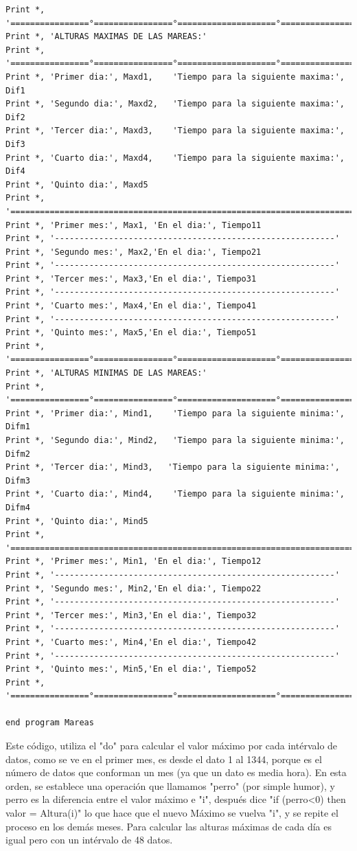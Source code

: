 \documentclass[12pt]{article}
\begin{document}
\begin{verbatim}
Print *, '================°================°====================°================°'
Print *, 'ALTURAS MAXIMAS DE LAS MAREAS:'
Print *, '================°================°====================°================°'
Print *, 'Primer dia:', Maxd1,    'Tiempo para la siguiente maxima:', Dif1
Print *, 'Segundo dia:', Maxd2,   'Tiempo para la siguiente maxima:', Dif2
Print *, 'Tercer dia:', Maxd3,    'Tiempo para la siguiente maxima:', Dif3
Print *, 'Cuarto dia:', Maxd4,    'Tiempo para la siguiente maxima:', Dif4
Print *, 'Quinto dia:', Maxd5    
Print *, '========================================================================'
Print *, 'Primer mes:', Max1, 'En el dia:', Tiempo11
Print *, '---------------------------------------------------------'
Print *, 'Segundo mes:', Max2,'En el dia:', Tiempo21
Print *, '---------------------------------------------------------'
Print *, 'Tercer mes:', Max3,'En el dia:', Tiempo31
Print *, '---------------------------------------------------------'
Print *, 'Cuarto mes:', Max4,'En el dia:', Tiempo41
Print *, '---------------------------------------------------------'
Print *, 'Quinto mes:', Max5,'En el dia:', Tiempo51
Print *, '================°================°====================°================°'
Print *, 'ALTURAS MINIMAS DE LAS MAREAS:'
Print *, '================°================°====================°================°'
Print *, 'Primer dia:', Mind1,    'Tiempo para la siguiente minima:', Difm1
Print *, 'Segundo dia:', Mind2,   'Tiempo para la siguiente minima:', Difm2
Print *, 'Tercer dia:', Mind3,   'Tiempo para la siguiente minima:', Difm3
Print *, 'Cuarto dia:', Mind4,    'Tiempo para la siguiente minima:', Difm4
Print *, 'Quinto dia:', Mind5
Print *, '========================================================================'
Print *, 'Primer mes:', Min1, 'En el dia:', Tiempo12
Print *, '---------------------------------------------------------'
Print *, 'Segundo mes:', Min2,'En el dia:', Tiempo22
Print *, '---------------------------------------------------------'
Print *, 'Tercer mes:', Min3,'En el dia:', Tiempo32
Print *, '---------------------------------------------------------'
Print *, 'Cuarto mes:', Min4,'En el dia:', Tiempo42
Print *, '---------------------------------------------------------'
Print *, 'Quinto mes:', Min5,'En el dia:', Tiempo52
Print *, '================°================°====================°================°'

end program Mareas
\end{verbatim}

Este código, utiliza el "do" para calcular el valor máximo por cada intérvalo de datos, como se ve en el primer mes, es desde el dato 1 al 1344, porque es el número de datos que conforman un mes (ya que un dato es media hora). En esta orden, se establece una operación que llamamos "perro" (por simple humor), y perro es la diferencia entre el valor máximo e "i", después dice "if (perro<0) then valor = Altura(i)" lo que hace que el nuevo Máximo se vuelva "i", y se repite el proceso en los demás meses. Para calcular las alturas máximas de cada día es igual pero con un intérvalo de 48 datos.
\end{document}
